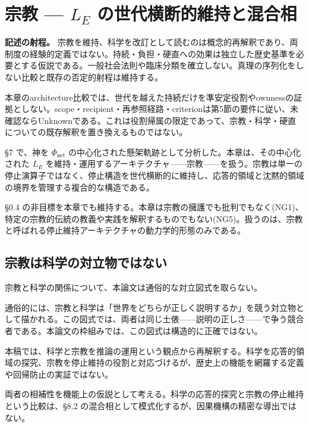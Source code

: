\section{宗教 — $L_E$ の世代横断的維持と混合相}

\noindent\textbf{記述の射程。} 宗教を維持、科学を改訂として読むのは概念的再解釈であり、両制度の経験的定義ではない。持続・負担・硬直への効果は独立した歴史基準を必要とする仮説である。一般社会法則や臨床分類を確立しない。真理の序列化をしない比較と既存の否定的射程は維持する。

本章のarchitecture比較では、世代を越えた持続だけを準安定役割やownnessの証拠としない。scope・recipient・再参照経路・criterionは第5節の要件に従い、未確認ならUnknownである。これは役割帰属の限定であって、宗教・科学・硬直についての既存解釈を置き換えるものではない。



\S{}7 で、神を $\Phi_{\text{net}}$ の中心化された懸架軌跡として分析した。本章は、その中心化された $L_E$ を維持・運用するアーキテクチャ——宗教——を扱う。宗教は単一の停止演算子ではなく、停止構造を世代横断的に維持し、応答的領域と沈黙的領域の境界を管理する複合的な構造である。

\S{}0.4 の非目標を本章でも維持する。本章は宗教の擁護でも批判でもなく(NG1)、特定の宗教的伝統の教義や実践を解釈するものでもない(NG5)。扱うのは、宗教と呼ばれる停止維持アーキテクチャの動力学的形態のみである。

\bigskip


\subsection{宗教は科学の対立物ではない}


宗教と科学の関係について、本論文は通俗的な対立図式を取らない。

通俗的には、宗教と科学は「世界をどちらが正しく説明するか」を競う対立物として描かれる。この図式では、両者は同じ土俵——説明の正しさ——で争う競合者である。本論文の枠組みでは、この図式は構造的に正確ではない。

本稿では、科学と宗教を推論の運用という観点から再解釈する。科学を応答的領域の探究、宗教を停止維持の役割と対応づけるが、歴史上の機能を網羅する定義や回帰防止の実証ではない。

両者の相補性を機能上の仮説として考える。科学の応答的探究と宗教の停止維持という比較は、\S{}8.2 の混合相として模式化するが、因果機構の精密な導出ではない。

\bigskip


